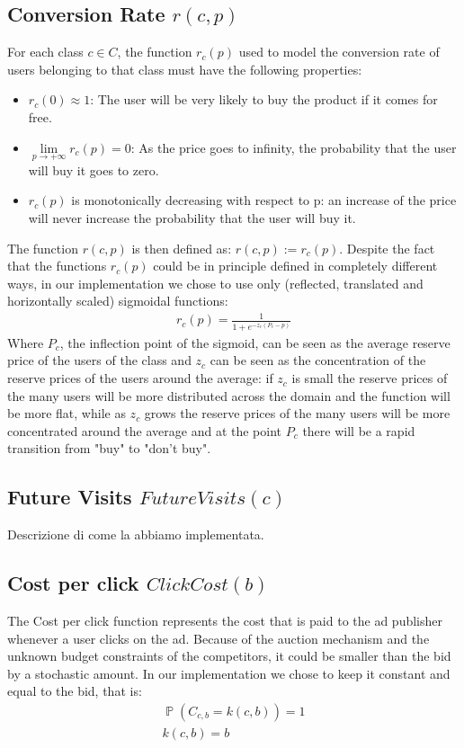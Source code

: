 \documentclass[11pt]{article} %
\DeclareMathOperator{\Prob}{\mathbb{P}}
\begin{document}
\subsection{Conversion Rate $r(c,p)$}
For each class $c \in C$, the function $r_c(p)$ used to model the conversion rate of users belonging to that class must have the following properties:
\begin{itemize}
\item $r_c(0) \approx 1$: The user will be very likely to buy the product if it comes for free.
\item $\lim\limits_{p \to +\infty} r_c(p) = 0$: As the price goes to infinity, the probability that the user will buy it goes to zero.
\item $r_c(p)$ is monotonically decreasing with respect to p: an increase of the price will never increase the probability that the user will buy it.
\end{itemize}
The function $r(c,p)$ is then defined as: $r(c,p) := r_c(p)$.
Despite the fact that the functions $r_c(p)$ could be in principle defined in completely different ways, in our implementation we chose to use only (reflected, translated and horizontally scaled) sigmoidal functions:
\begin{align*}
r_c(p) = \frac{1}{1+e^{-z_c(P_c-p)}}
\end{align*}
Where $P_c$, the inflection point of the sigmoid, can be seen as the average reserve price of the users of the class and $z_c$ can be seen as the concentration of the reserve prices of the users around the average: if $z_c$ is small the reserve prices of the many users will be more distributed across the domain and the function will be more flat, while as $z_c$ grows the reserve prices of the many users will be more concentrated around the average and at the point $P_c$ there will be a rapid transition from "buy" to "don't buy".
\subsection{Future Visits $FutureVisits(c)$}
{\color{red}Descrizione di come la abbiamo implementata.}

\subsection{Cost per click $ClickCost(b)$}
The Cost per click function represents the cost that is paid to the ad publisher whenever a user clicks on the ad. Because of the  auction mechanism and the unknown budget constraints of the competitors, it could be smaller than the bid by a stochastic amount.
\newline
\newline
In our implementation we chose to keep it constant and equal to the bid, that is:
\begin{align*}
\Prob(C_{c,b} = k(c,b)) = 1\\
k(c,b) = b
\end{align*}
\end{document}
